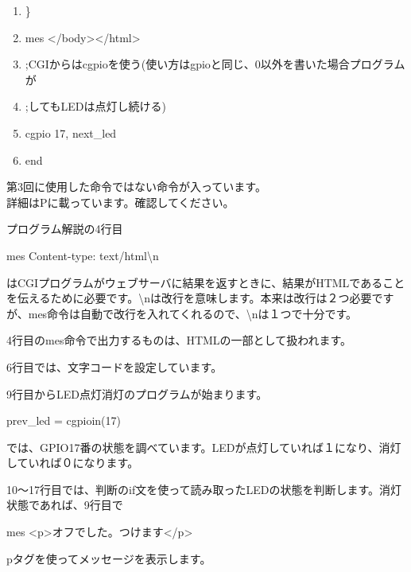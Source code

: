 \documentclass[a4paper,12pt,dvipdfmx]{jarticle}
\begin{document}
\begin{boxedminipage}{0.95\textwidth}
\begin{enumerate}
	\item \}

	\item mes {\textquotedbl}{\textless}/body{\textgreater}{\textless}/html{\textgreater}{\textquotedbl}

	\item ;CGIからはcgpioを使う(使い方はgpioと同じ、0以外を書いた場合プログラムが

	\item ;してもLEDは点灯し続ける)

	\item cgpio 17, next\_led

	\item end
	\end{enumerate}

\end{boxedminipage}
\flushleft



第3回に使用した命令ではない命令が入っています。\\
詳細はP\pageref{P:gpio}に載っています。確認してください。

プログラム解説の4行目

mes {\textquotedbl}Content-type: text/html{\textbackslash}n{\textquotedbl}

はCGIプログラムがウェブサーバに結果を返すときに、結果がHTMLであることを伝えるために必要です。{\textbackslash}nは改行を意味します。本来は改行は２つ必要ですが、mes命令は自動で改行を入れてくれるので、{\textbackslash}nは１つで十分です。


\bigskip
\clearpage
4行目のmes命令で出力するものは、HTMLの一部として扱われます。

\bigskip

6行目では、文字コードを設定しています。

\bigskip

9行目からLED点灯消灯のプログラムが始まります。

prev\_led = cgpioin(17)

では、GPIO17番の状態を調べています。LEDが点灯していれば１になり、消灯していれば０になります。


\bigskip


10〜17行目では、判断のif文を使って読み取ったLEDの状態を判断します。消灯状態であれば、9行目で

mes
	{\textquotedbl}{\textless}p{\textgreater}オフでした。つけます{\textless}/p{\textgreater}{\textquotedbl}

pタグを使ってメッセージを表示します。
\end{document}
